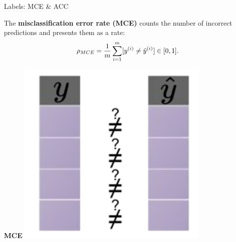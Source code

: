 \documentclass[11pt,compress,t,notes=noshow, xcolor=table]{beamer}
\begin{document}
\begin{vbframe}{Labels: MCE \& ACC}

\begin{minipage}[t]{0.75\textwidth} 
  \small
  The \textbf{misclassification error rate (MCE)} counts the number of incorrect 
  predictions and presents them as a rate:
  $$ \rho_{MCE} = \frac{1}{m} \sum_{i = 1}^m [y^{(i)} \neq \hat{y}^{(i)}] \in [0, 1]. $$
\end{minipage}%
\begin{minipage}[t]{0.25\textwidth}
  \centering
  \begin{center}
    \textbf{MCE}
    \includegraphics[width=0.7\textwidth]
    {figure_man/eval-classif-loss-compare-mce.pdf}
  \end{center}
\end{minipage}

\lz


\end{vbframe}
\end{document}
